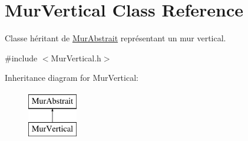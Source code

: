\hypertarget{classMurVertical}{\section{Mur\-Vertical Class Reference}
\label{classMurVertical}
}


Classe héritant de \hyperlink{classMurAbstrait}{Mur\-Abstrait} représentant un mur vertical.  




{\ttfamily \#include $<$Mur\-Vertical.\-h$>$}

Inheritance diagram for Mur\-Vertical\-:\begin{figure}[H]
\begin{center}
\leavevmode
\includegraphics[height=2.000000cm]{classMurVertical}
\end{center}
\end{figure}

